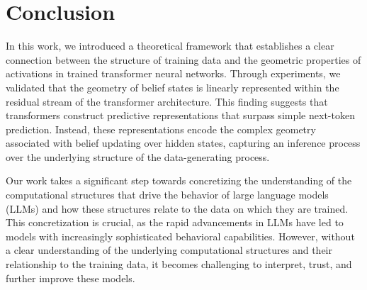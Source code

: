 \documentclass{article}
\begin{document}
\section{Conclusion}

In this work, we introduced a theoretical framework that establishes a clear connection between the structure of training data and the geometric properties of activations in trained transformer neural networks. Through experiments, we validated that the geometry of belief states is linearly represented within the residual stream of the transformer architecture. This finding suggests that transformers construct predictive representations that surpass simple next-token prediction. Instead, these representations encode the complex geometry associated with belief updating over hidden states, capturing an inference process over the underlying structure of the data-generating process.

Our work takes a significant step towards concretizing the understanding of the computational structures that drive the behavior of large language models (LLMs) and how these structures relate to the data on which they are trained. This concretization is crucial, as the rapid advancements in LLMs have led to models with increasingly sophisticated behavioral capabilities. However, without a clear understanding of the underlying computational structures and their relationship to the training data, it becomes challenging to interpret, trust, and further improve these models.

\medskip
\end{document}
